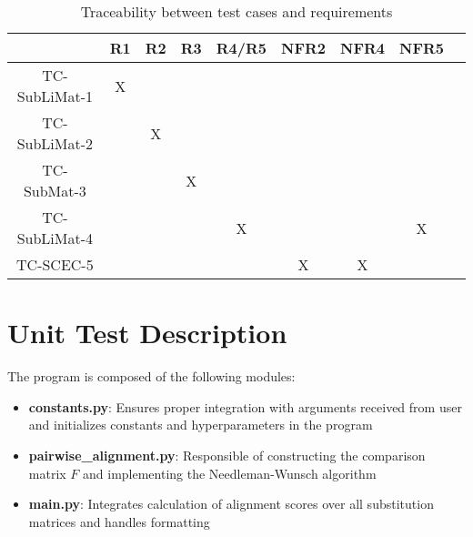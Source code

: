 \documentclass[12pt, titlepage]{article}
\begin{document}
\begin{table}[h]
  \centering
  \begin{tabular}{|c|c|c|c|c|c|c|c|c|}
  \hline
   & R1 & R2 & R3 & R4/R5 & NFR2 & NFR4 & NFR5 \\
  \hline
  TC-SubLiMat-1 & X &   &   &   &   &   &   \\
  \hline
  TC-SubLiMat-2 &   & X &   &   &   &   &   \\
  \hline
  TC-SubMat-3   &   &   & X &   &   &   &   \\
  \hline
  TC-SubLiMat-4 &   &   &   & X &   &   & X \\
  \hline
  TC-SCEC-5     &   &   &   &   & X & X &   \\
  \hline
  \end{tabular}
  \caption{Traceability between test cases and requirements}
  \label{tab:traceability}
\end{table}

\section{Unit Test Description}\label{unittd:main}

The program \progname{} is composed of the following modules:

\begin{itemize}
  \item \textbf{constants.py}: Ensures proper integration with arguments received from user and initializes constants and hyperparameters in the program
  \item \textbf{pairwise\_alignment.py}: Responsible of constructing the comparison matrix $F$ and implementing the Needleman-Wunsch algorithm
  \item \textbf{main.py}: Integrates calculation of alignment scores over all substitution matrices and handles formatting
  \end{itemize}
  



\end{document}
